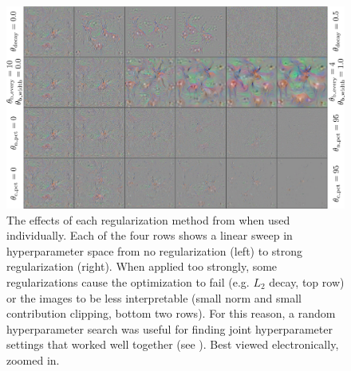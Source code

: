 \documentclass{article}
\begin{document}
\begin{figure}[!th]
\begin{center}
\centerline{\includegraphics[width=1.0\linewidth]{regularization_sweep_crop.pdf}}
\caption{The effects of each regularization method from  when used individually. Each of the four rows shows a linear sweep in hyperparameter space from no regularization (left) to strong regularization (right).
  When applied too strongly, some regularizations cause the optimization to fail (e.g. $L_2$ decay, top row) or the images to be less interpretable (small norm and small contribution clipping, bottom two rows). For this reason, a random hyperparameter search was useful for finding joint hyperparameter settings that worked well together (see ).
Best viewed electronically, zoomed in.
}
\end{center}
\end{figure}
\end{document}
